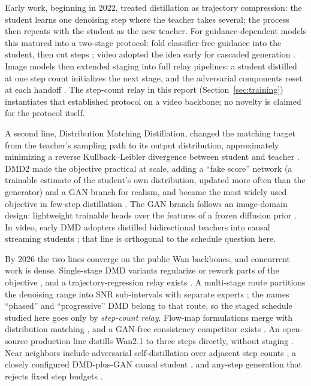 \documentclass[11pt,a4paper]{article}
\begin{document}
Early work, beginning in 2022, treated distillation as trajectory compression: the student learns one denoising step where the teacher takes several; the process then repeats with the student as the new teacher. For guidance-dependent models this matured into a two-stage protocol: fold classifier-free guidance into the student, then cut steps \cite{guideddistill}; video adopted the idea early for cascaded generation \cite{imagenvideo}. Image models then extended staging into full relay pipelines: a student distilled at one step count initializes the next stage, and the adversarial components reset at each handoff \cite{sdxllightning,hypersd}. The step-count relay in this report (Section~\ref{sec:training}) instantiates that established protocol on a video backbone; no novelty is claimed for the protocol itself.

A second line, Distribution Matching Distillation, changed the matching target from the teacher's sampling path to its output distribution, approximately minimizing a reverse Kullback–Leibler divergence between student and teacher \cite{dmd1}. DMD2 made the objective practical at scale, adding a ``fake score'' network (a trainable estimate of the student's own distribution, updated more often than the generator) and a GAN branch for realism, and became the most widely used objective in few-step distillation \cite{dmd2}. The GAN branch follows an image-domain design: lightweight trainable heads over the features of a frozen diffusion prior \cite{ladd}. In video, early DMD adopters distilled bidirectional teachers into causal streaming students \cite{causvid,selfforcing}; that line is orthogonal to the schedule question here.

By 2026 the two lines converge on the public Wan backbones, and concurrent work is dense. Single-stage DMD variants regularize or rework parts of the objective \cite{codmd,sgmd}, and a trajectory-regression relay exists \cite{gpd}. A multi-stage route partitions the denoising range into SNR sub-intervals with separate experts \cite{phaseddmd}; the names ``phased'' and ``progressive'' DMD belong to that route, so the staged schedule studied here goes only by \emph{step-count relay}. Flow-map formulations merge with distribution matching \cite{tmd}, and a GAN-free consistency competitor exists \cite{rcm}. An open-source production line distills Wan2.1 to three steps directly, without staging \cite{fastwan}. Near neighbors include adversarial self-distillation over adjacent step counts \cite{asd}, a closely configured DMD-plus-GAN causal student \cite{oneforcing}, and any-step generation that rejects fixed step budgets \cite{anyflow}.
\end{document}
